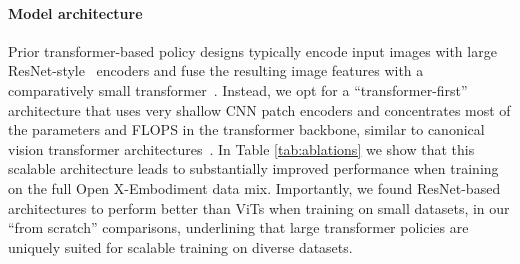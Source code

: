 \begin{table}
\centering
{}

\caption{\textbf{Model Ablations.} We achieve best performance when using the ViT architecture, diffusion action head, and wide training data mixture. All evaluations are performed on the WidowX setup. Success rates are averaged over 40 trials across two language-conditioned tasks and two goal-conditioned tasks.}
\label{tab:ablations}
\end{table}

\paragraph{Model architecture} Prior transformer-based policy designs typically encode input images with large ResNet-style~\citep{he2016deep} encoders and fuse the resulting image features with a comparatively small transformer~\citep{brohan2022rt,open_x_embodiment_rt_x_2023,shah2023vint,chi2023diffusionpolicy,zhao2023learning,mees2022matters,shridhar2023perceiver}. Instead, we opt for a ``transformer-first'' architecture that uses very shallow CNN patch encoders and concentrates most of the parameters and FLOPS in the transformer backbone, similar to canonical vision transformer architectures~\citep{dosovitskiy2020image}. In Table \ref{tab:ablations} we show that this scalable architecture leads to substantially improved performance when training on the full Open X-Embodiment data mix. Importantly, we found ResNet-based architectures to perform better than ViTs when training on small datasets, \eg in our ``from scratch'' comparisons, underlining that large transformer policies are uniquely suited for scalable training on diverse datasets.

